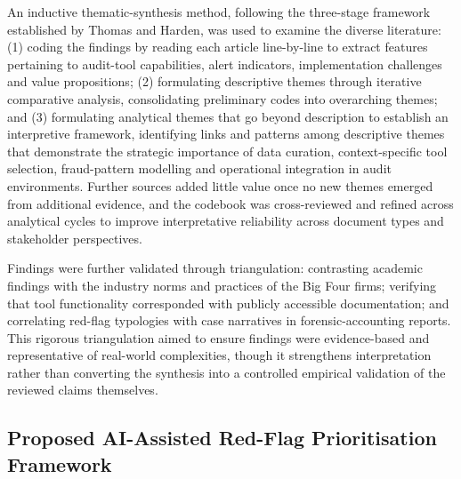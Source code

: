 \documentclass[preprint,12pt]{elsarticle}
\begin{document}
An inductive thematic-synthesis method, following the three-stage framework established by Thomas and Harden, was used to examine the diverse literature: (1) coding the findings by reading each article line-by-line to extract features pertaining to audit-tool capabilities, alert indicators, implementation challenges and value propositions; (2) formulating descriptive themes through iterative comparative analysis, consolidating preliminary codes into overarching themes; and (3) formulating analytical themes that go beyond description to establish an interpretive framework, identifying links and patterns among descriptive themes that demonstrate the strategic importance of data curation, context-specific tool selection, fraud-pattern modelling and operational integration in audit environments. Further sources added little value once no new themes emerged from additional evidence, and the codebook was cross-reviewed and refined across analytical cycles to improve interpretative reliability across document types and stakeholder perspectives.

Findings were further validated through triangulation: contrasting academic findings with the industry norms and practices of the Big Four firms; verifying that tool functionality corresponded with publicly accessible documentation; and correlating red-flag typologies with case narratives in forensic-accounting reports. This rigorous triangulation aimed to ensure findings were evidence-based and representative of real-world complexities, though it strengthens interpretation rather than converting the synthesis into a controlled empirical validation of the reviewed claims themselves.

\subsection{Proposed AI-Assisted Red-Flag Prioritisation Framework}
\label{sec:framework}
\end{document}
